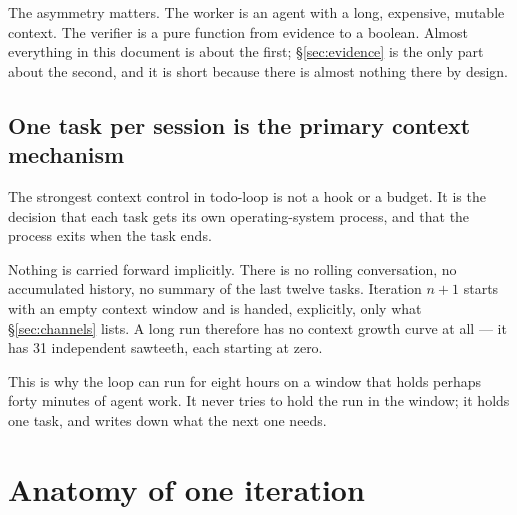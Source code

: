 \documentclass[11pt,a4paper]{article}
\begin{document}
The asymmetry matters. The worker is an agent with a long, expensive, mutable
context. The verifier is a pure function from evidence to a boolean. Almost
everything in this document is about the first; \S\ref{sec:evidence} is the
only part about the second, and it is short because there is almost nothing
there by design.

\subsection{One task per session is the primary context mechanism}

The strongest context control in todo-loop is not a hook or a budget. It is the
decision that each task gets its own operating-system process, and that the
process exits when the task ends.

Nothing is carried forward implicitly. There is no rolling conversation, no
accumulated history, no summary of the last twelve tasks. Iteration $n{+}1$
starts with an empty context window and is handed, explicitly, only what
\S\ref{sec:channels} lists. A long run therefore has no context growth curve at
all --- it has 31 independent sawteeth, each starting at zero.

This is why the loop can run for eight hours on a window that holds perhaps
forty minutes of agent work. It never tries to hold the run in the window; it
holds one task, and writes down what the next one needs.

\section{Anatomy of one iteration}
\end{document}

